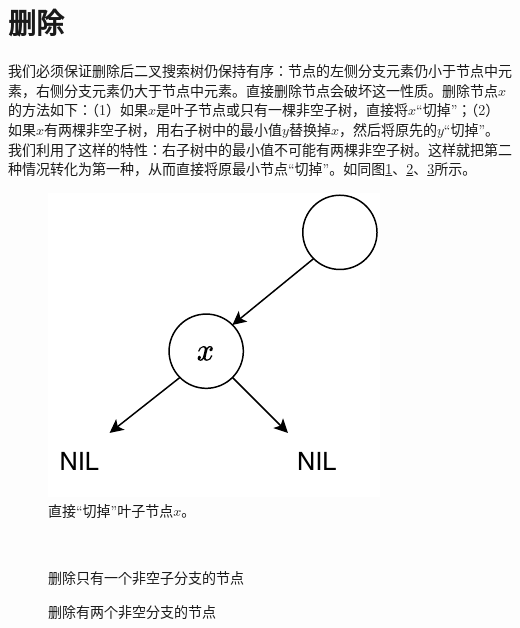 \documentclass[b5paper]{ctexart}
\begin{document}
\section{删除}
我们必须保证删除后二叉搜索树仍保持有序：节点的左侧分支元素仍小于节点中元素，右侧分支元素仍大于节点中元素。直接删除节点会破坏这一性质。删除节点$x$的方法如下\cite{sgi-stl}：（1）如果$x$是叶子节点或只有一棵非空子树，直接将$x$“切掉”；（2）如果$x$有两棵非空子树，用右子树中的最小值$y$替换掉$x$，然后将原先的$y$“切掉”。我们利用了这样的特性：右子树中的最小值不可能有两棵非空子树。这样就把第二种情况转化为第一种，从而直接将原最小节点“切掉”。如同图\ref{fig:del-leaf}、\ref{fig:del-1child}、\ref{fig:del-branch}所示。

\begin{figure}[htbp]
  \centering
  \includegraphics[scale=0.5]{img/del-leaf}
  \caption{直接“切掉”叶子节点$x$。}
  \label{fig:del-leaf}
\end{figure}

\begin{figure}[htbp]
  \centering
   \\
  \caption{删除只有一个非空子分支的节点}
  \label{fig:del-1child}
\end{figure}

\begin{figure}[htbp]
  \centering
  \caption{删除有两个非空分支的节点}
  \label{fig:del-branch}
\end{figure}
\end{document}
